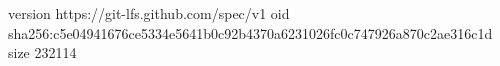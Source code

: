 version https://git-lfs.github.com/spec/v1
oid sha256:c5e04941676ce5334e5641b0c92b4370a6231026fc0c747926a870c2ae316c1d
size 232114
